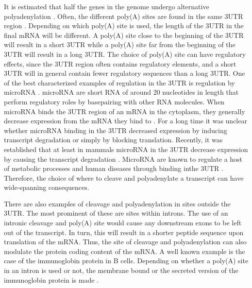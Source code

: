 It is estimated that half the genes in the genome undergo alternative
polyadenylation \cite{tian_large-scale_2005}. Often, the different poly(A)
sites are found in the same 3\ppp UTR region \cite{beaudoing_patterns_2000}.
Depending on which poly(A) site is used, the length of the 3\ppp UTR in the
final mRNA will be different. A poly(A) site close to the beginning of
the 3\ppp UTR will result in a short 3\ppp UTR while a poly(A) site far
from the beginning of the 3\ppp UTR will result in a long 3\ppp UTR. The
choice of poly(A) site can have regulatory effects, since the 3\ppp UTR region
often contains regulatory elements, and a short 3\ppp UTR will in general
contain fewer regulatory sequences than a long 3\ppp UTR. One of the best
characterized examples of regulation in the 3\ppp UTR is regulation by microRNA
\cite{digiammartino_mechanisms_2011}. microRNA are short RNA of around 20
nucleotides in length that perform regulatory roles by basepairing with other
RNA molecules. When microRNA binds the 3\ppp UTR region of an mRNA in the
cytoplasm, they generally decrease expression from the mRNA they bind to
\cite{bartel_micrornas:_2004}. For a long time it was unclear whether microRNA
binding in the 3\ppp UTR decreased expression by inducing transcript
degradation or simply by blocking translation. Recently, it was established
that at least in mammals microRNA in the 3\ppp UTR decrease expression by
causing the transcript degradation \cite{huntzinger_gene_2011}. MicroRNA are
known to regulate a host of metabolic processes and human diseases through
binding inthe 3\ppp UTR \cite{huang_biological_2010}. Therefore, the choice of
where to cleave and polyadenylate a transcript can have wide-spanning
consequences.

There are also examples of cleavage and polyadenylation in sites outside the
3\ppp UTR. The most prominent of these are sites within introns. The use of an
intronic cleavage and poly(A) site would cause any downstream exons to be left
out of the transcript. In turn, this will result in a shorter peptide sequence
upon translation of the mRNA. Thus, the site of cleavage and polyadenylation
can also modulate the protein coding content of the mRNA. A well known example
is the case of the immunoglobin protein in B cells. Depending on whether a
poly(A) site in an intron is used or not, the membrane bound or the secreted
version of the immunoglobin protein is made \cite{peterson_regulated_1989}.

